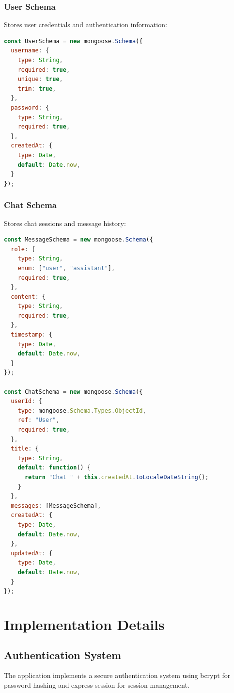 \documentclass[12pt,a4paper]{article}
\begin{document}
\subsubsection{User Schema}
Stores user credentials and authentication information:
\begin{lstlisting}[language=JavaScript]
const UserSchema = new mongoose.Schema({
  username: {
    type: String,
    required: true,
    unique: true,
    trim: true,
  },
  password: {
    type: String,
    required: true,
  },
  createdAt: {
    type: Date,
    default: Date.now,
  }
});
\end{lstlisting}

\subsubsection{Chat Schema}
Stores chat sessions and message history:
\begin{lstlisting}[language=JavaScript]
const MessageSchema = new mongoose.Schema({
  role: {
    type: String,
    enum: ["user", "assistant"],
    required: true,
  },
  content: {
    type: String,
    required: true,
  },
  timestamp: {
    type: Date,
    default: Date.now,
  }
});

const ChatSchema = new mongoose.Schema({
  userId: {
    type: mongoose.Schema.Types.ObjectId,
    ref: "User",
    required: true,
  },
  title: {
    type: String,
    default: function() {
      return "Chat " + this.createdAt.toLocaleDateString();
    }
  },
  messages: [MessageSchema],
  createdAt: {
    type: Date,
    default: Date.now,
  },
  updatedAt: {
    type: Date,
    default: Date.now,
  }
});
\end{lstlisting}

\section{Implementation Details}

\subsection{Authentication System}
The application implements a secure authentication system using bcrypt for password hashing and express-session for session management.
\end{document}

